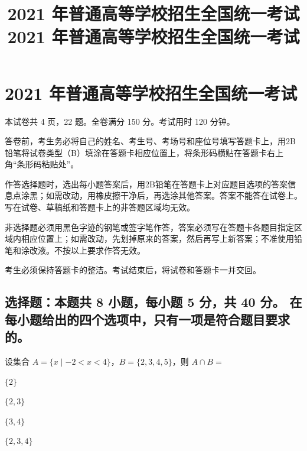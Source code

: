 \documentclass{exam-zh}
\title{2021 年普通高等学校招生全国统一考试}
\begin{document}
\tableofcontents

\chapter{2021 年普通高等学校招生全国统一考试}


\title{2021 年普通高等学校招生全国统一考试}

\subject{数学（理科）}

\secret

\maketitle

本试卷共 4 页，22 题。全卷满分 150 分。考试用时 120 分钟。


\begin{notice}
  \item 答卷前，考生务必将自己的姓名、考生号、考场号和座位号填写答题卡上，用2B铅笔将试卷类型（B）填涂在答题卡相应位置上，将条形码横贴在答题卡右上角“条形码粘贴处”。
  \item 作答选择题时，选出每小题答案后，用2B铅笔在答题卡上对应题目选项的答案信息点涂黑；如需改动，用橡皮擦干净后，再选涂其他答案。答案不能答在试卷上。
    写在试卷、草稿纸和答题卡上的非答题区域均无效。
  \item 非选择题必须用黑色字迹的钢笔或签字笔作答，答案必须写在答题卡各题目指定区域内相应位置上；如需改动，先划掉原来的答案，然后再写上新答案；不准使用铅笔和涂改液。不按以上要求作答无效。
  \item 考生必须保持答题卡的整洁。考试结束后，将试卷和答题卡一并交回。
\end{notice}



\section{%
  选择题：本题共 8 小题，每小题 5 分，共 40 分。
  在每小题给出的四个选项中，只有一项是符合题目要求的。
}

\begin{question}[points = 2]
  设集合 $A = \{x \mid -2 < x < 4\}$，$B = \{2, 3, 4, 5\}$，则 $A \cap B = $ \paren[]

  \begin{choices}
    \item $\{2\}$
    \item $\{2, 3\}$
    \item $\{3, 4\}$
    \item $\{2, 3, 4\}$
  \end{choices}
\end{question}
\end{document}
